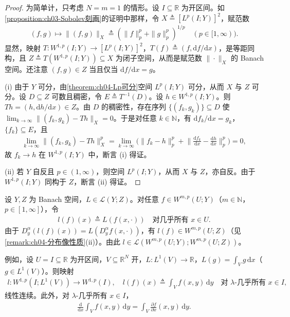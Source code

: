 \documentclass[../../main.tex]{subfiles}%
\begin{document}
\begin{proof}
为简单计，只考虑 $N=m=1$ 的情形。设 $I\subseteq\mathbb{R}$ 为开区间。如\cref{proposition:ch03-Sobolev刻画}的证明中那样，令 $X\triangleq [L^p(I;Y)]^2$，赋范数
\begin{align*}
(f,g)\mapsto\|(f,g)\|_X\triangleq (\|f\|_p^p+\|g\|_p^p)^{1/p}\quad(p\in[1,\infty)).
\end{align*}
显然，映射 $T:W^{1,p}(I;Y)\to[L^p(I;Y)]^2$，$T(f)\triangleq (f,\mathrm{d}f/\mathrm{d}x)$，是等距同构，且 $Z\triangleq T(W^{1,p}(I;Y))\subseteq X$ 为闭子空间，从而是赋范数 $\|\cdot\|_X$ 的 Banach 空间。还注意 $(f,g)\in Z$ 当且仅当 $\mathrm{d}f/\mathrm{d}x=g$。

(i) 由于 $Y$ 可分，由\cref{theorem:ch04-Lp可分}空间 $L^p(I;Y)$ 可分，从而 $X$ 与 $Z$ 可分。设 $D\subseteq Z$ 可数且稠密，令 $E\triangleq T^{-1}(D)$。设 $h\in W^{1,p}(I;Y)$。则 $Th=(h,\mathrm{d}h/\mathrm{d}x)\in Z$。由 $D$ 的稠密性，存在序列 $\{(f_k,g_k)\}\subseteq D$ 使 $\lim_{k\to\infty}\|(f_k,g_k)-Th\|_X=0$。于是对任意 $k\in\mathbb{N}$，有 $\mathrm{d}f_k/\mathrm{d}x=g_k$，$\{f_k\}\subseteq E$，且
\begin{align*}
\lim_{k\to\infty}\|(f_k,g_k)-Th\|_X^p=\lim_{k\to\infty}\Big(\|f_k-h\|_p^p+\Big\|\frac{\mathrm{d}f_k}{\mathrm{d}x}-\frac{\mathrm{d}h}{\mathrm{d}x}\Big\|_p^p\Big)=0,
\end{align*}
故 $f_k\to h$ 在 $W^{1,p}(I;Y)$ 中，断言 (i) 得证。

(ii) 若 $Y$ 自反且 $p\in(1,\infty)$，则空间 $L^p(I;Y)$，从而 $X$ 与 $Z$，亦自反。由于 $W^{1,p}(I;Y)$ 同构于 $Z$，断言 (ii) 得证。
\end{proof}

\begin{remark}\label{remark:ch04-Sobolev算子}
设 $Y,Z$ 为 Banach 空间，$L\in\mathcal{L}(Y;Z)$。对任意 $f\in W^{m,p}(U;Y)$（$m\in\mathbb{N}$，$p\in[1,\infty]$），令
\begin{align*}
l(f)(x)\triangleq L(f(x,\cdot))\quad\text{对几乎所有 }x\in U.
\end{align*}
由于 $D_y^\alpha(l(f)(x))=L(D_y^\alpha f(x,\cdot))$，有 $l(f)\in W^{m,p}(U;Z)$（见\cref{remark:ch04-分布像性质}(ii)）。由此 $l\in\mathcal{L}(W^{m,p}(U;Y);W^{m,p}(U;Z))$。

例如，设 $U=I\subseteq\mathbb{R}$ 为开区间，$V\subseteq\mathbb{R}^N$ 开，$L:L^1(V)\to\mathbb{R}$，$L(g)=\int_V g\,\mathrm{d}x$（$g\in L^1(V)$）。则映射
\begin{align*}
l:W^{1,p}(I;L^1(V))\to W^{1,p}(I),\quad l(f)(x)\triangleq \int_V f(x,y)\,\mathrm{d}y\quad\text{对 }\lambda\text{-几乎所有 }x\in I,
\end{align*}
线性连续。此外，对 $\lambda$-几乎所有 $x\in I$，
\begin{align*}
\frac{\mathrm{d}}{\mathrm{d}x}\int_V f(x,y)\,\mathrm{d}y=\int_V\frac{\partial f}{\partial x}(x,y)\,\mathrm{d}y.
\end{align*}
\end{remark}
\end{document}
